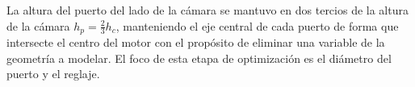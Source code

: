 La altura del puerto del lado de la cámara se mantuvo en dos tercios de la
altura de la cámara $h_{p} = \frac{2}{3}h_{c}$, manteniendo el eje central de cada
puerto de forma que intersecte el centro del motor con el propósito de eliminar
una variable de la geometría a modelar.
%
El foco de esta etapa de optimización es el diámetro del puerto y el reglaje.
%

